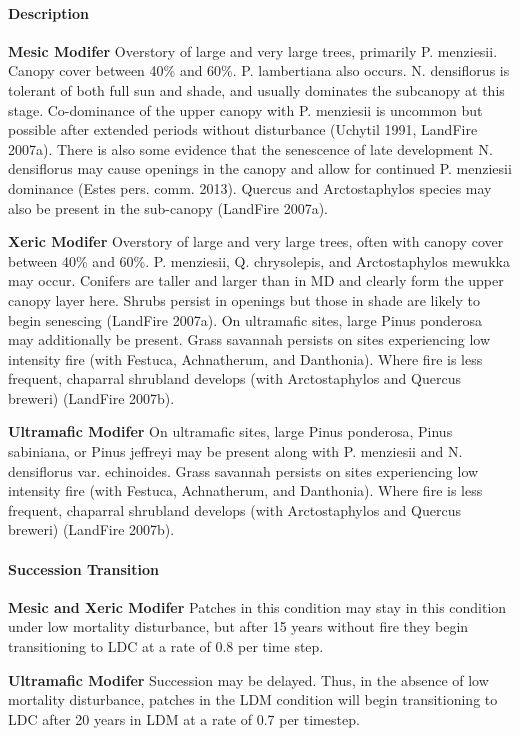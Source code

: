 \paragraph{Description}
\begin{adjustwidth}{2cm}{}
\textbf{Mesic Modifer } Overstory of large and very large trees, primarily P. menziesii. Canopy cover between 40\% and 60\%. P. lambertiana also occurs. N. densiflorus is tolerant of both full sun and shade, and usually dominates the subcanopy at this stage. Co-dominance of the upper canopy with P. menziesii is uncommon but possible after extended periods without disturbance (Uchytil 1991, LandFire 2007a). There is also some evidence that the senescence of late development N. densiflorus may cause openings in the canopy and allow for continued P. menziesii dominance (Estes pers. comm. 2013). Quercus and Arctostaphylos species may also be present in the sub-canopy (LandFire 2007a).

\medskip
\noindent \textbf{Xeric Modifer} Overstory of large and very large trees, often with canopy cover between 40\% and 60\%. P. menziesii, Q. chrysolepis, and Arctostaphylos mewukka may occur. Conifers are taller and larger than in MD and clearly form the upper canopy layer here. Shrubs persist in openings but those in shade are likely to begin senescing (LandFire 2007a). On ultramafic sites, large Pinus ponderosa may additionally be present. Grass savannah persists on sites experiencing low intensity fire (with Festuca, Achnatherum, and Danthonia). Where fire is less frequent, chaparral shrubland develops (with Arctostaphylos and Quercus breweri) (LandFire 2007b).

\medskip
\noindent \textbf{Ultramafic Modifer} On ultramafic sites, large Pinus ponderosa, Pinus sabiniana, or Pinus jeffreyi may be present along with P. menziesii and N. densiflorus var. echinoides. Grass savannah persists on sites experiencing low intensity fire (with Festuca, Achnatherum, and Danthonia). Where fire is less frequent, chaparral shrubland develops (with Arctostaphylos and Quercus breweri) (LandFire 2007b).

\end{adjustwidth}
\paragraph{Succession Transition}
\begin{adjustwidth}{2cm}{}
\textbf{Mesic and Xeric Modifer } Patches in this condition may stay in this condition under low mortality disturbance, but after 15 years without fire they begin transitioning to LDC at a rate of 0.8 per time step. 

\medskip
\noindent \textbf{Ultramafic Modifer} Succession may be delayed. Thus, in the absence of low mortality disturbance, patches in the LDM condition will begin transitioning to LDC after 20 years in LDM at a rate of 0.7 per timestep. 

\end{adjustwidth}
